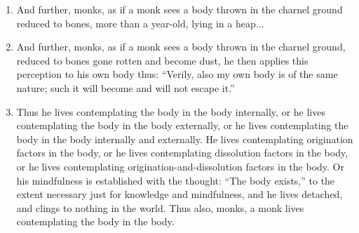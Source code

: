 \documentclass[a4 paper, 12pt]{article}
\begin{document}
\begin{multicols}{2}
\begin{enumerate}[resume]
\item And further, monks, as if a monk sees a body thrown in the charnel ground reduced to bones, more than a year-old, lying in a heap...
\item And further, monks, as if a monk sees a body thrown in the charnel ground, reduced to bones gone rotten and become dust, he then applies this perception to his own body thus: “Verily, also my own body is of the same nature; such it will become and will not escape it.”
\item Thus he lives contemplating the body in the body internally, or he lives contemplating the body in the body externally, or he lives contemplating the body in the body internally and externally. He lives contemplating origination factors in the body, or he lives contemplating dissolution factors in the body, or he lives contemplating origination-and-dissolution factors in the body. Or his mindfulness is established with the thought: “The body exists,” to the extent necessary just for knowledge and mindfulness, and he lives detached, and clings to nothing in the world. Thus also, monks, a monk lives contemplating the body in the body.
\end{enumerate}


\end{multicols}
\end{document}
